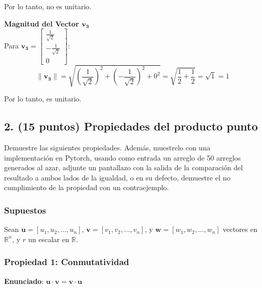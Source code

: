 \documentclass[12 pt]{article}
\begin{document}
\begin{center}
Por lo tanto, no es unitario.\\
\end{center}

\textbf{Magnitud del Vector \(\mathbf{v_3}\)}\\

Para \(\mathbf{v_3} = \begin{bmatrix} \frac{1}{\sqrt{2}} \\ -\frac{1}{\sqrt{2}} \\ 0 \end{bmatrix}\):
\[
\|\mathbf{v_3}\| = \sqrt{\left(\frac{1}{\sqrt{2}}\right)^2 + \left(-\frac{1}{\sqrt{2}}\right)^2 + 0^2}
= \sqrt{\frac{1}{2} + \frac{1}{2}}
= \sqrt{1}
= 1
\]

\begin{center}
Por lo tanto, es unitario.
\end{center}

\subsection*{2. (15 puntos) Propiedades del producto punto}

Demuestre las siguientes propiedades. Además, muestrelo con una implementación en Pytorch, usando como entrada un arreglo de 50 arreglos generados al azar, adjunte un pantallazo con la salida de la comparación del resultado a ambos lados de la igualdad, o en su defecto, demuestre el no cumplimiento de la propiedad con un contraejemplo.

\subsubsection*{Supuestos}

Sean \(\mathbf{u} = [u_1, u_2, \dots, u_n]\), \(\mathbf{v} = [v_1, v_2, \dots, v_n]\), y \(\mathbf{w} = [w_1, w_2, \dots, w_n]\) vectores en \(\mathbb{R}^n\), y \(r\) un escalar en \(\mathbb{R}\).


\subsubsection*{Propiedad 1: Conmutatividad}

\begin{center}
\textbf{Enunciado}: \(\mathbf{u} \cdot \mathbf{v} = \mathbf{v} \cdot \mathbf{u}\)\\
\end{center}
\end{document}
